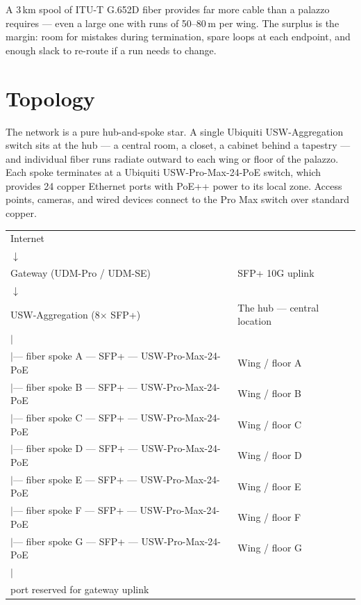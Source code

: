 \documentclass[10pt, letterpaper]{article}
\begin{document}
A 3\,km spool of ITU-T G.652D fiber provides far more cable than a palazzo requires --- even a large one with runs of 50--80\,m per wing. The surplus is the margin: room for mistakes during termination, spare loops at each endpoint, and enough slack to re-route if a run needs to change.

\section{Topology}

The network is a pure hub-and-spoke star. A single Ubiquiti USW-Aggregation switch sits at the hub --- a central room, a closet, a cabinet behind a tapestry --- and individual fiber runs radiate outward to each wing or floor of the palazzo. Each spoke terminates at a Ubiquiti USW-Pro-Max-24-PoE switch, which provides 24 copper Ethernet ports with PoE++ power to its local zone. Access points, cameras, and wired devices connect to the Pro Max switch over standard copper.

\begin{metricbox}
\begin{tabularx}{\textwidth}{@{} >{\ttfamily\small}l @{\quad} l @{}}
Internet & \\
\quad$\downarrow$ & \\
Gateway (UDM-Pro / UDM-SE) & SFP+ 10G uplink \\
\quad$\downarrow$ & \\
USW-Aggregation (8$\times$ SFP+) & The hub --- central location \\
\quad$\mid$ & \\
\quad$\mid$--- fiber spoke A --- SFP+ --- USW-Pro-Max-24-PoE & Wing / floor A \\
\quad$\mid$--- fiber spoke B --- SFP+ --- USW-Pro-Max-24-PoE & Wing / floor B \\
\quad$\mid$--- fiber spoke C --- SFP+ --- USW-Pro-Max-24-PoE & Wing / floor C \\
\quad$\mid$--- fiber spoke D --- SFP+ --- USW-Pro-Max-24-PoE & Wing / floor D \\
\quad$\mid$--- fiber spoke E --- SFP+ --- USW-Pro-Max-24-PoE & Wing / floor E \\
\quad$\mid$--- fiber spoke F --- SFP+ --- USW-Pro-Max-24-PoE & Wing / floor F \\
\quad$\mid$--- fiber spoke G --- SFP+ --- USW-Pro-Max-24-PoE & Wing / floor G \\
\quad$\mid$ & \\
\quad 1 port reserved for gateway uplink & \\
\end{tabularx}
\end{metricbox}
\end{document}
